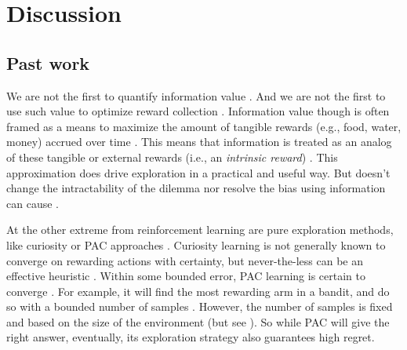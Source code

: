 \documentclass[9pt,lineno]{elife}
\begin{document}
\section*{Discussion}
\subsection*{Past work}
We are not the first to quantify information value \citep{Kolchinsky2018,CogliatiDezza2017}. And we are not the first to use such value to optimize reward collection \citep{Kelly1956,Schmidhuber1991,Dayan1996,deAbril2018,Itti2009}. Information value though is often framed as a means to maximize the amount of tangible rewards (e.g., food, water, money) accrued over time \citep{Sutton2018}. This means that information is treated as an analog of these tangible or external rewards (i.e., an \textit{intrinsic reward}) \citep{Schmidhuber1991,Berger-Tal2014,Itti2009,Friston2016}. This approximation does drive exploration in a practical and useful way. But doesn't change the intractability of the dilemma nor resolve the bias using information can cause \citep{Thrun1992a,Dayan1996,Findling2018,Gershman2018b}. 


At the other extreme from reinforcement learning are pure exploration methods, like curiosity \citep{Berlyne1950,Jaegle2019,Pathak2017} or PAC approaches \citep{Valiant1984}. Curiosity learning is not generally known to converge on rewarding actions with certainty, but never-the-less can be an effective heuristic \citep{Pathak2017,Burda2018,Colas2019}. Within some bounded error, PAC learning is certain to converge \citep{Valiant1984}. For example, it will find the most rewarding arm in a bandit, and do so with a bounded number of samples \citep{Even-Dar2002}. However, the number of samples is fixed and based on the size of the environment (but see \citep{Even-Dar2006,Strehl2009}). So while PAC will give the right answer, eventually, its exploration strategy also guarantees high regret.
\end{document}
